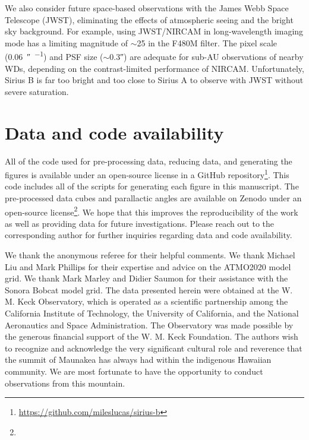 \documentclass[twocolumn]{aastex631}
\begin{document}
We also consider future space-based observations with the James Webb Space Telescope (JWST), eliminating the effects of atmospheric seeing and the bright sky background. For example, using JWST/NIRCAM in long-wavelength imaging mode has a limiting magnitude of $\sim$25 in the F480M filter. The pixel scale (\qty{0.06}{\arcsecond\per\pixel}) and PSF size ($\sim$\ang{;;0.3}) are adequate for sub-AU observations of nearby WDs, depending on the contrast-limited performance of NIRCAM. Unfortunately, Sirius B is far too bright and too close to Sirius A to observe with JWST without severe saturation.

\section{Data and code availability} \label{sec:data}
All of the code used for pre-processing data, reducing data, and generating the figures is available under an open-source license in a GitHub repository\footnote{\url{https://github.com/mileslucas/sirius-b}}. This code includes all of the scripts for generating each figure in this manuscript. The pre-processed data cubes and parallactic angles are available on Zenodo under an open-source license\footnote{}. We hope that this improves the reproducibility of the work as well as providing data for future investigations. Please reach out to the corresponding author for further inquiries regarding data and code availability.

\begin{acknowledgements}
We thank the anonymous referee for their helpful comments. We thank Michael Liu and Mark Phillips for their expertise and advice on the ATMO2020 model grid. We thank Mark Marley and Didier Saumon for their assistance with the Sonora Bobcat model grid. The data presented herein were obtained at the W. M. Keck Observatory, which is operated as a scientific partnership among the California Institute of Technology, the University of California, and the National Aeronautics and Space Administration. The Observatory was made possible by the generous financial support of the W. M. Keck Foundation. The authors wish to recognize and acknowledge the very significant cultural role and reverence that the summit of Maunakea has always had within the indigenous Hawaiian community. We are most fortunate to have the opportunity to conduct observations from this mountain.
\end{acknowledgements}
\end{document}
